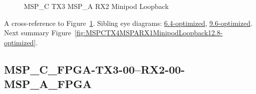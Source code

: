 \begin{figure}[h]
\begin{subfigure}{0.33\textwidth}
\hyperref[sec:MSPCFPGATX306RX206MSPAFPGA12.8-optimized]{}
\end{subfigure}\hspace*{\fill}
\begin{subfigure}{0.33\textwidth}
\hyperref[sec:MSPCFPGATX307RX207MSPAFPGA12.8-optimized]{}
\end{subfigure}\hspace*{\fill}
\begin{subfigure}{0.33\textwidth}
\hyperref[sec:MSPCFPGATX308RX208MSPAFPGA12.8-optimized]{}
\end{subfigure}

\begin{subfigure}{0.33\textwidth}
\hyperref[sec:MSPCFPGATX309RX209MSPAFPGA12.8-optimized]{}
\end{subfigure}\hspace*{\fill}
\begin{subfigure}{0.33\textwidth}
\hyperref[sec:MSPCFPGATX310RX210MSPAFPGA12.8-optimized]{}
\end{subfigure}\hspace*{\fill}
\begin{subfigure}{0.33\textwidth}
\hyperref[sec:MSPCFPGATX311RX211MSPAFPGA12.8-optimized]{}
\end{subfigure}

\caption{MSP\_C TX3 MSP\_A RX2 Minipod Loopback} \label{fig:MSPCTX3MSPARX2MinipodLoopback12.8-optimized}
\end{figure}

A cross-reference to Figure~\ref{fig:MSPCTX3MSPARX2MinipodLoopback12.8-optimized}.
Sibling eye diagrams: \hyperref[sec:MSPCTX3MSPARX2MinipodLoopback6.4-optimized]{6.4-optimized}, \hyperref[sec:MSPCTX3MSPARX2MinipodLoopback9.6-optimized]{9.6-optimized}. \\
Next summary Figure~\ref{fig:MSPCTX4MSPARX1MinipodLoopback12.8-optimized}.
\clearpage
% 
\subsection{MSP\_C\_FPGA-TX3-00--RX2-00-MSP\_A\_FPGA}\label{sec:MSPCFPGATX300RX200MSPAFPGA12.8-optimized}

